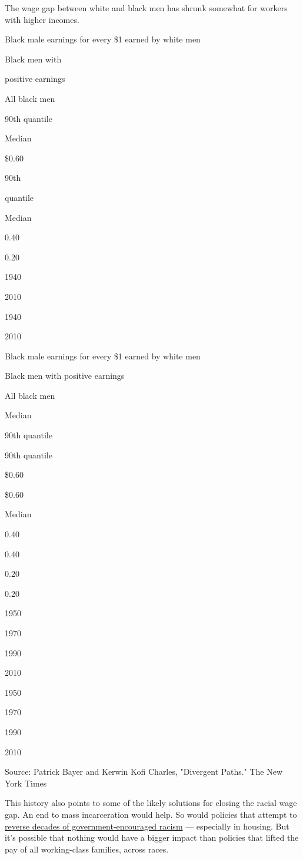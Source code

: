 The wage gap between white and black men has shrunk somewhat for workers
with higher incomes.

Black male earnings for every \$1 earned by white men

Black men with

positive earnings

All black men

90th quantile

Median

\$0.60

90th

quantile

Median

0.40

0.20

1940

2010

1940

2010

Black male earnings for every \$1 earned by white men

Black men with positive earnings

All black men

Median

90th quantile

90th quantile

\$0.60

\$0.60

Median

0.40

0.40

0.20

0.20

1950

1970

1990

2010

1950

1970

1990

2010

Source: Patrick Bayer and Kerwin Kofi Charles, "Divergent Paths."
\textbar{} The New York Times

This history also points to some of the likely solutions for closing the
racial wage gap. An end to mass incarceration would help. So would
policies that attempt to
\href{https://www.nytimes.com/interactive/2020/06/24/magazine/reparations-slavery.html}{reverse
decades of government-encouraged racism} --- especially in housing. But
it's possible that nothing would have a bigger impact than policies that
lifted the pay of all working-class families, across races.

